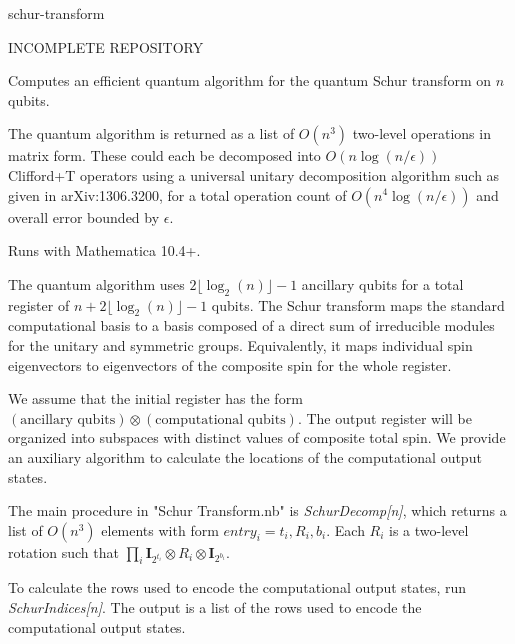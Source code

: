 schur-transform

INCOMPLETE REPOSITORY

Computes an efficient quantum algorithm for the quantum Schur transform on $n$ qubits.

The quantum algorithm is returned as a list of $O(n^3)$ two-level operations in matrix form. These could each be decomposed into $O(n\log(n/\epsilon))$ Clifford+T operators using a universal unitary decomposition algorithm such as given in arXiv:1306.3200, for a total operation count of $O(n^4\log(n/\epsilon))$ and overall error bounded by $\epsilon$.

Runs with Mathematica 10.4+.

The quantum algorithm uses $2\lfloor\log_2(n)\rfloor-1$ ancillary qubits for a total register of $n+2\lfloor\log_2(n)\rfloor-1$ qubits. The Schur transform maps the standard computational basis to a basis composed of a direct sum of irreducible modules for the unitary and symmetric groups. Equivalently, it maps individual spin eigenvectors to eigenvectors of the composite spin for the whole register.

We assume that the initial register has the form $(\text{ancillary qubits})\otimes(\text{computational qubits})$. The output register will be organized into subspaces with distinct values of composite total spin. We provide an auxiliary algorithm to calculate the locations of the computational output states.

The main procedure in "Schur Transform.nb" is \emph{SchurDecomp[n]},  which returns a list of $O(n^3)$ elements with form $entry_i={t_i,R_i,b_i}$. Each $R_i$ is a two-level rotation such that $\prod_i\textbf{I}_{2^{t_i}}\otimes R_i\otimes\textbf{I}_{2^{b_i}}$.

To calculate the rows used to encode the computational output states, run \emph{SchurIndices[n]}. The output is a list of the rows used to encode the computational output states.
